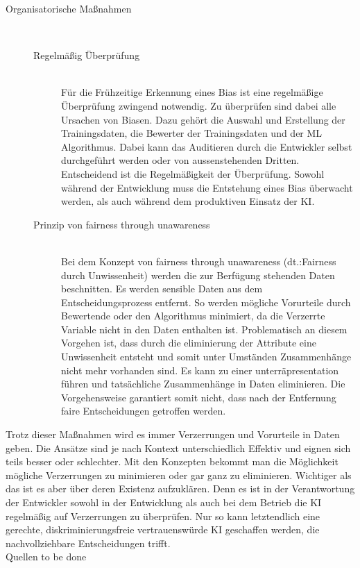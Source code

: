 \begin{onehalfspace}
\begin{description}
            \item[Organisatorische Maßnahmen] \hfill \\
            \begin{description}
                \item [Regelmäßig Überprüfung] \hfill \\
                Für die Frühzeitige Erkennung eines Bias ist eine regelmäßige Überprüfung zwingend notwendig. Zu überprüfen sind dabei alle Ursachen von Biasen. Dazu gehört die Auswahl und Erstellung der Trainingsdaten, die Bewerter der Trainingsdaten und der \ac{ML} Algorithmus. 
                Dabei kann das Auditieren durch die Entwickler selbst durchgeführt werden oder von aussenstehenden Dritten. Entscheidend ist die Regelmäßigkeit der Überprüfung. Sowohl während der Entwicklung muss die Entstehung eines Bias überwacht werden, als auch während dem produktiven Einsatz der \ac{KI}.\cite{Drew2019}\cite{hagendorff2019maschinelles}\cite{Dilmegani2020}\cite{Google}

                \item[Prinzip von \glqq{}fairness through unawareness\grqq{}] \hfill \\
                Bei dem Konzept von \glqq{}fairness through unawareness\grqq{} (\ac*{dt}.:Fairness durch Unwissenheit) werden die zur Berfügung stehenden Daten beschnitten. Es werden sensible Daten aus dem Entscheidungsprozess entfernt. So werden mögliche Vorurteile durch Bewertende oder den Algorithmus minimiert, da die Verzerrte Variable nicht in den Daten enthalten ist. Problematisch an diesem Vorgehen ist, dass durch die eliminierung der Attribute eine Unwissenheit entsteht und somit unter Umständen Zusammenhänge nicht mehr vorhanden sind. Es kann zu einer unterräpresentation führen und tatsächliche Zusammenhänge in Daten eliminieren. Die Vorgehensweise garantiert somit nicht, dass nach der Entfernung faire Entscheidungen getroffen werden.\cite{hagendorff2019maschinelles}

            \end{description}
            
        \end{description}
        Trotz dieser Maßnahmen wird es immer Verzerrungen und Vorurteile in Daten geben. Die Ansätze sind je nach Kontext unterschiedlich Effektiv und eignen sich teils besser oder schlechter. Mit den Konzepten bekommt man die Möglichkeit mögliche Verzerrungen zu minimieren oder gar ganz zu eliminieren. Wichtiger als das ist es aber über deren Existenz aufzuklären. Denn es ist in der Verantwortung der Entwickler sowohl in der Entwicklung als auch bei dem Betrieb die \ac*{KI} regelmäßig auf Verzerrungen zu überprüfen.\cite{Drew2019} Nur so kann letztendlich eine gerechte, diskriminierungsfreie vertrauenswürde \ac*{KI} geschaffen werden, die nachvollziehbare Entscheidungen trifft.
        \\
        Quellen to be done
        \cite{Dilmegani2020}
        
    \newpage
\end{onehalfspace}